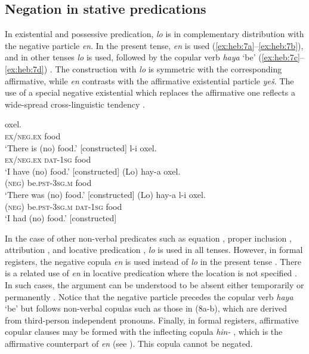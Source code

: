 \documentclass[output=paper,colorlinks,citecolor=brown]{langscibook}
\begin{document}
\subsection{Negation in stative predications} \label{sec:heb:2.3}

In existential and possessive predication, \textit{lo} is in complementary distribution with the negative particle \textit{en}. In the present tense, \textit{en} is used (\ref{ex:heb:7a}--\ref{ex:heb:7b}), and in other tenses \textit{lo} is used, followed by the copular verb \textit{haya} ‘be’ (\ref{ex:heb:7c}--\ref{ex:heb:7d}) \citep[173]{Tzivoni1993}. The construction with \textit{lo} is symmetric with the corresponding affirmative, while \textit{en} contrasts with the affirmative existential particle \textit{yeš}. The use of a special negative existential which replaces the affirmative one reflects a wide-spread cross-linguistic tendency \citep{Veselinova2013neg.exist}.

\ea\label{ex:heb:7}
    \ea\label{ex:heb:7a}
         oxel.\\ 
             \textsc{ex/neg.ex} food\\
        \glt ‘There is (no) food.’ [constructed]
    \ex\label{ex:heb:7b}
         l-i oxel.\\
             \textsc{ex/neg.ex} \textsc{dat-1sg} food\\
        \glt ‘I have (no) food.’ [constructed]
    \ex\label{ex:heb:7c}
        \gll (Lo) hay-a oxel.\\
             \textsc{(neg)} be.\textsc{pst{}-3sg.m} food\\
        \glt ‘There was (no) food.’ [constructed]
    \ex\label{ex:heb:7d}
        \gll (Lo) hay-a l-i oxel.\\
             \textsc{(neg)} be.\textsc{pst{}-3sg.m} \textsc{dat-1sg} food\\
        \glt ‘I had (no) food.’ [constructed]
    \z 
\z 

In the case of other non-verbal predicates such as equation , proper inclusion , attribution , and locative predication , \textit{lo} is used in all tenses. However, in formal registers, the negative copula \textit{en} is used instead of \textit{lo} in the present tense \citep[201]{Tzivoni1993}. There is a related use of \textit{en} in locative predication where the location is not specified . In such cases, the argument can be understood to be absent either temporarily or permanently \citep[181]{Tzivoni1993}. Notice that the negative particle precedes the copular verb \textit{haya} ‘be’  but follows non-verbal copulas such as those in (8a-b), which are derived from third-person independent pronouns. Finally, in formal registers, affirmative copular clauses may be formed with the inflecting copula \textit{hin-} , which is the affirmative counterpart of \textit{en} (see ). This copula cannot be negated.
\end{document}
